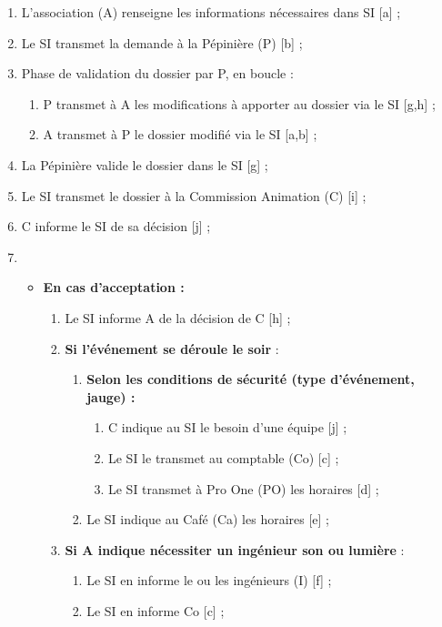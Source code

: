 \begin{enumerate}
\item L'association (A) renseigne les informations nécessaires dans SI [a] ;
\item Le SI transmet la demande à la Pépinière (P) [b] ;
\item Phase de validation du dossier par P, en boucle : 
	\begin{enumerate}
	\item P transmet à A les modifications à apporter au dossier via le SI [g,h] ;
	\item A transmet à P le dossier modifié via le SI [a,b] ;
	\end{enumerate}
\item La Pépinière valide le dossier dans le SI [g] ; 
\item Le SI transmet le dossier à la Commission Animation (C) [i] ;
\item C informe le SI de sa décision [j] ;
\item
\begin{itemize}
	\item \textbf{En cas d'acceptation :}
	\begin{enumerate}
		\item Le SI informe A de la décision de C [h] ;
		\item \textbf{Si l'événement se déroule le soir} :
		\begin{enumerate}
			\item \textbf{Selon les conditions de sécurité (type d'événement, jauge) :}
			\begin{enumerate}
				\item C indique au SI le besoin d'une équipe [j] ;
				\item Le SI le transmet au comptable (Co) [c] ;
				\item Le SI transmet à Pro One (PO) les horaires [d] ;
			\end{enumerate}
			\item Le SI indique au Café (Ca) les horaires [e] ;
		\end{enumerate}
		\item \textbf{Si A indique nécessiter un ingénieur son ou lumière} :
		\begin{enumerate}
			\item Le SI en informe le ou les ingénieurs (I) [f] ;
			\item Le SI en informe Co [c] ;
		\end{enumerate}
	\end{enumerate}

\end{itemize}
\end{enumerate}
